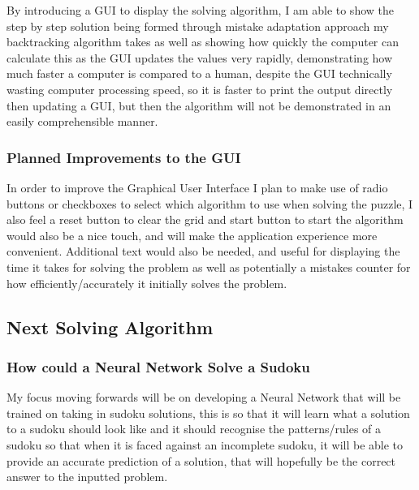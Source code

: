 \documentclass[]{final_report}
\begin{document}
By introducing a GUI to display the solving algorithm, I am able to show the step by step solution being formed through mistake adaptation approach my backtracking algorithm takes as well as showing how quickly the computer can calculate this as the GUI updates the values very rapidly, demonstrating how much faster a computer is compared to a human, despite the GUI technically wasting computer processing speed, so it is faster to print the output directly then updating a GUI, but then the algorithm will not be demonstrated in an easily comprehensible manner. 

\subsubsection{Planned Improvements to the GUI} 

In order to improve the Graphical User Interface I plan to make use of radio buttons or checkboxes to select which algorithm to use when solving the puzzle, I also feel a reset button to clear the grid and start button to start the algorithm would also be a nice touch, and will make the application experience more convenient. Additional text would also be needed, and useful for displaying the time it takes for solving the problem as well as potentially a mistakes counter for how efficiently/accurately it initially solves the problem. 

\subsection*{Next Solving Algorithm} 

\subsubsection{How could a Neural Network Solve a Sudoku} 

My focus moving forwards will be on developing a Neural Network that will be trained on taking in sudoku solutions, this is so that it will learn what a solution to a sudoku should look like and it should recognise the patterns/rules of a sudoku so that when it is faced against an incomplete sudoku, it will be able to provide an accurate prediction of a solution, that will hopefully be the correct answer to the inputted problem.
\end{document}
